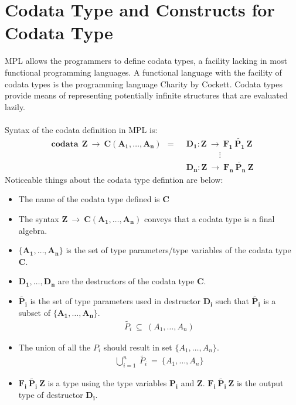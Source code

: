 \documentclass[11pt]{article}
\begin{document}
\section {Codata Type and Constructs for Codata Type}\label{SeqMPL:codataandCDCons}
MPL allows the programmers to define codata types, a facility lacking in most functional programming languages. A functional language with the facility of codata types is the programming language Charity by Cockett. Codata types provide means of representing potentially infinite structures that are evaluated lazily.
~~\\~~\\
Syntax of the codata definition in MPL is:
\begin{align*} 
\mathbf{codata~~Z~\to~C(A_1,\ldots,A_n)~~=~~}
        &\mathbf{D_1: Z~\to~F_1~\tilde{P_1}~Z}\\
        &\mathbf{\qquad\qquad \vdots} \\    
        &\mathbf{D_n: Z~\to~F_n~\tilde{P_n}~Z}
\end{align*}
Noticeable things about the codata type defintion are below:
\begin{itemize}
  \item The name of the codata type defined is $\mathbf{C}$
  \item The syntax $\mathbf{Z~\to~C(A_1,\ldots,A_n)}$ conveys that a codata type is a final algebra.
  \item $\mathbf{\{A_1,\ldots,A_n\}}$ is the set of type parameters/type variables of the codata type $\mathbf{C}$.
  \item $\mathbf{D_1,\ldots,D_n}$ are the destructors of the codata type $\mathbf{C}$.
  \item $\mathbf{\tilde{P_i}}$ is the set of type parameters used in destructor $\mathbf{D_i}$ such that $\mathbf{\tilde{P_i}}$ is a subset of $\mathbf{\{A_1,\ldots,A_n\}}$.
  \begin{align*}
    \tilde{P_i}~\subseteq~(A_1,\ldots,A_n)
  \end{align*}
  \item The union of all the ${P_i}$ should result in set $\{A_1,\ldots,A_n\}$.   
  \begin{align*}
    \bigcup\limits_{i=1}^{n}~\tilde{P_i}~=~\{A_1,\ldots,A_n\}
  \end{align*}
  \item $\mathbf{F_i~\tilde{P_i}~Z}$ is a type using the type variables $\mathbf{P_i}$ and $\mathbf{Z}$. $\mathbf{F_i~\tilde{P_i}~Z}$ is the output type of destructor $\mathbf{D_i}$.
\end{itemize}
\end{document}
